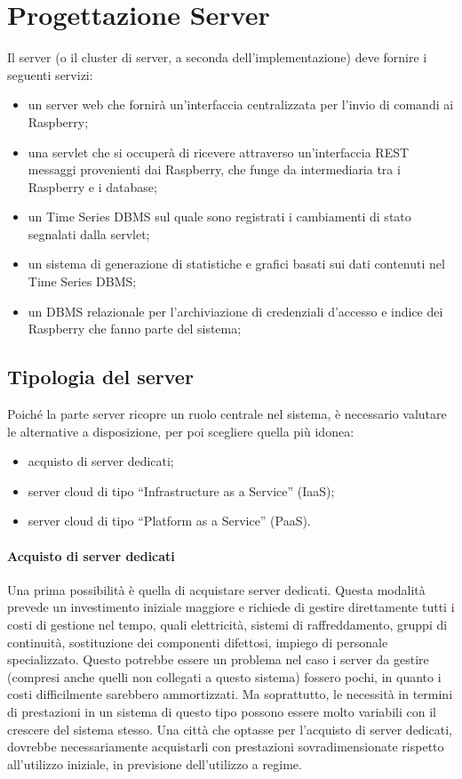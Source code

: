 \section{Progettazione Server}
Il server (o il cluster di server, a seconda dell'implementazione) deve fornire i seguenti servizi:
\begin{itemize}
 \item un server web che fornirà un'interfaccia centralizzata per l'invio di comandi ai Raspberry;
 \item una servlet che si occuperà di ricevere attraverso un'interfaccia REST messaggi provenienti dai Raspberry, che funge da intermediaria tra i Raspberry e i database;
 \item un Time Series DBMS sul quale sono registrati i cambiamenti di stato segnalati dalla servlet;
 \item un sistema di generazione di statistiche e grafici basati sui dati contenuti nel Time Series DBMS;
 \item un DBMS relazionale per l'archiviazione di credenziali d'accesso e indice dei Raspberry che fanno parte del sistema;
\end{itemize}

\subsection{Tipologia del server}
Poiché la parte server ricopre un ruolo centrale nel sistema, è necessario valutare le alternative a disposizione, per poi scegliere quella più idonea:
\begin{itemize}
 \item acquisto di server dedicati;
 \item server cloud di tipo ``Infrastructure as a Service'' (IaaS);
 \item server cloud di tipo ``Platform as a Service'' (PaaS).
\end{itemize}
\paragraph{Acquisto di server dedicati}
Una prima possibilità è quella di acquistare server dedicati. Questa modalità prevede un investimento iniziale maggiore e richiede di gestire direttamente tutti i costi di gestione nel tempo, quali elettricità, sistemi di raffreddamento, gruppi di continuità, sostituzione dei componenti difettosi, impiego di personale specializzato. Questo potrebbe essere un problema nel caso i server da gestire (compresi anche quelli non collegati a questo sistema) fossero pochi, in quanto i costi difficilmente sarebbero ammortizzati. Ma soprattutto, le necessità in termini di prestazioni in un sistema di questo tipo possono essere molto variabili con il crescere del sistema stesso. Una città che optasse per l'acquisto di server dedicati, dovrebbe necessariamente acquistarli con prestazioni sovradimensionate rispetto all'utilizzo iniziale, in previsione dell'utilizzo a regime.
